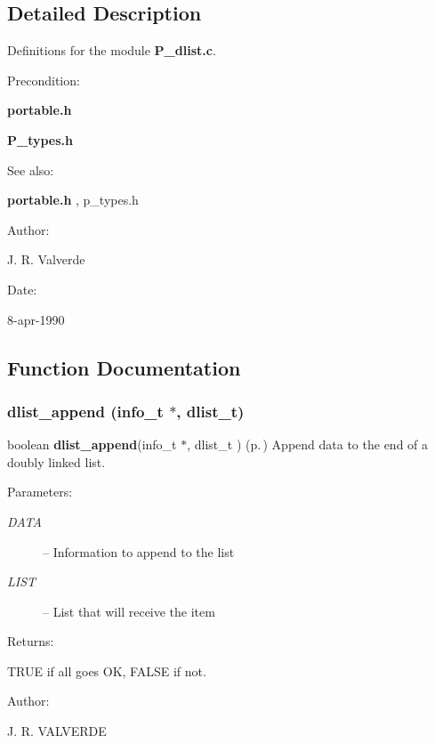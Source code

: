 \subsection{Detailed Description}
Definitions for the module {\bf P\_\-dlist.c}.

 

 \begin{Desc}
\item[Precondition: ]\par
{\bf portable.h} \par
{\bf P\_\-types.h}\end{Desc}
\begin{Desc}
\item[See also: ]\par
{\bf portable.h} , p\_\-types.h\end{Desc}
\begin{Desc}
\item[Author: ]\par
J. R. Valverde \end{Desc}
\begin{Desc}
\item[Date: ]\par
8-apr-1990\end{Desc}


\subsection{Function Documentation}
\subsubsection{ dlist\_\-append (info\_\-t $\ast$, {\bf dlist\_\-t})}\label{P__dlist_8h_a3}


boolean {\bf dlist\_\-append}(info\_\-t $\ast$, dlist\_\-t ) {\rm (p.\,\pageref{P__dlist_8h_a3})} Append data to the end of a doubly linked list.

\begin{Desc}
\item[Parameters: ]\par
\begin{description}
\item[{\em 
DATA}]-- Information to append to the list \item[{\em 
LIST}]-- List that will receive the item \end{description}
\end{Desc}
\begin{Desc}
\item[Returns: ]\par
TRUE if all goes OK, FALSE if not.\end{Desc}
\begin{Desc}
\item[Author: ]\par
J. R. VALVERDE \end{Desc}
